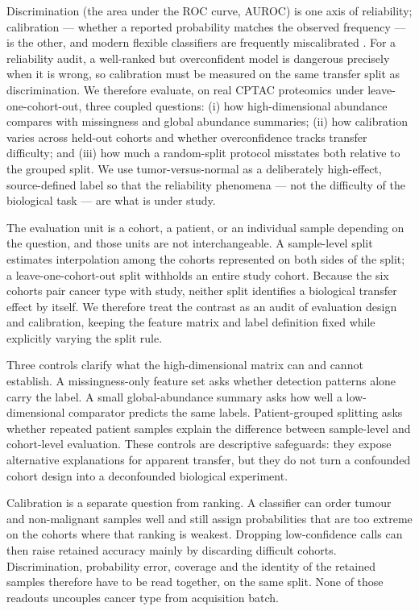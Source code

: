 \documentclass[journal=jprobs,manuscript=article,hyperref,doi=true]{achemso}
\begin{document}
Discrimination (the area under the ROC curve, AUROC) is one axis of reliability; calibration --- whether a reported probability matches the
observed frequency --- is the other, and modern flexible classifiers are frequently miscalibrated
\citep{GuoCalibration}. For a reliability audit, a well-ranked but overconfident model is dangerous precisely when it
is wrong, so calibration must be measured on the same transfer split as discrimination. We therefore evaluate, on
real CPTAC proteomics under leave-one-cohort-out, three coupled questions: (i) how high-dimensional abundance compares with missingness and global abundance summaries; (ii) how
calibration varies across held-out cohorts and whether overconfidence tracks transfer difficulty; and (iii) how
much a random-split protocol misstates both relative to the grouped split. We use tumor-versus-normal as a
deliberately high-effect, source-defined label so that the reliability phenomena --- not the difficulty of the
biological task --- are what is under study.


The evaluation unit is a cohort, a patient, or an individual sample depending on the question, and those units are not interchangeable. A sample-level split estimates interpolation among the cohorts represented on both sides of the split; a leave-one-cohort-out split withholds an entire study cohort. Because the six cohorts pair cancer type with study, neither split identifies a biological transfer effect by itself. We therefore treat the contrast as an audit of evaluation design and calibration, keeping the feature matrix and label definition fixed while explicitly varying the split rule.

Three controls clarify what the high-dimensional matrix can and cannot establish. A missingness-only feature set asks whether detection patterns alone carry the label. A small global-abundance summary asks how well a low-dimensional comparator predicts the same labels. Patient-grouped splitting asks whether repeated patient samples explain the difference between sample-level and cohort-level evaluation. These controls are descriptive safeguards: they expose alternative explanations for apparent transfer, but they do not turn a confounded cohort design into a deconfounded biological experiment.

Calibration is a separate question from ranking. A classifier can order tumour and non-malignant samples well and still assign probabilities that are too extreme on the cohorts where that ranking is weakest. Dropping low-confidence calls can then raise retained accuracy mainly by discarding difficult cohorts. Discrimination, probability error, coverage and the identity of the retained samples therefore have to be read together, on the same split. None of those readouts uncouples cancer type from acquisition batch.
\end{document}
